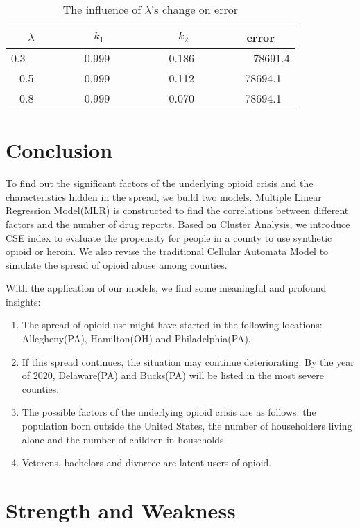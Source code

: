 \documentclass{mcmthesis}
\begin{document}
  \begin{table}[!h]
\centering
\caption{The influence of $\lambda$'s change on error}
 \label{tab:sensitivity analysis}
\begin{tabular}{ccc|c}
\toprule[2.5pt]
$\lambda$ & $k_1$ & $k_2$ & error \\
\midrule[1.5pt]
0.3 \ \ \ \ &  \ \ \ \ 0.999 \ \ \ \ & \ \ \ \ 0.186 \ \ \ \ & \ \ \ \ 78691.4 \\
\midrule
0.5 \ & \ 0.999 \ & \ 0.112 \ & \ 78694.1 \\
\midrule
0.8 \ & \ 0.999 \ & \ 0.070 \ & \ 78694.1 \\
\bottomrule
\end{tabular}
\end{table}

\section{Conclusion}
  To find out the significant factors of the underlying opioid crisis and the characteristics hidden in the spread, we build two models. Multiple Linear Regression Model(MLR) is constructed to find the correlations between different factors and the number of drug reports. Based on Cluster Analysis, we introduce CSE index to evaluate the propensity for people in a county to use synthetic opioid or heroin. We also revise the traditional Cellular Automata Model to simulate the spread of opioid abuse among counties. \par
 With the application of our models, we find some meaningful and profound insights: 
 \begin{enumerate} 
  \item The spread of opioid use might have started in the following locations: Allegheny(PA), Hamilton(OH) and Philadelphia(PA).
  \item If this spread continues, the situation may continue deteriorating. By the year of 2020, Delaware(PA) and Bucks(PA) will be listed in the most severe counties.
  \item The possible factors of the underlying opioid crisis are as follows:
    the population born outside the United States, the number of householders living alone and the number of children in households.
  \item Veterens, bachelors and divorcee are latent users of opioid.
 \end{enumerate}

\section{Strength and Weakness}
\end{document}
